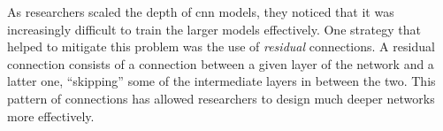 
As researchers scaled the depth of \gls{cnn} models, they
noticed that it was increasingly difficult to train the
larger models effectively. One strategy that helped to
mitigate this problem was the use of \emph{residual}
connections. A residual connection consists of a connection
between a given layer of the network and a latter one,
``skipping'' some of the intermediate layers in between the
two. This pattern of connections has allowed researchers to
design much deeper networks more effectively.